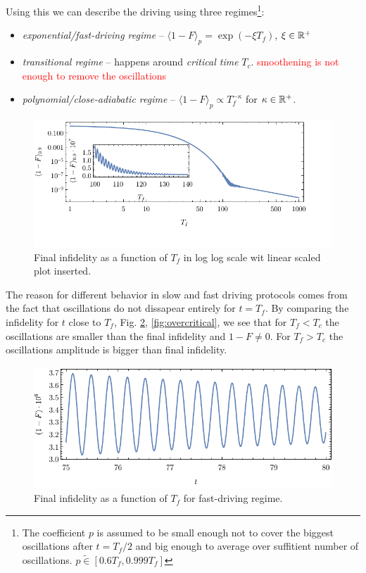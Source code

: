 Using this we can describe the driving using three regimes\footnote{The coefficient $p$ is assumed to be small enough not to cover the biggest oscillations after $t=T_f/2$ and big enough to average over suffitient number of oscillations. $p\tilde\in[0.6T_f,0.999T_f]$}:
\begin{itemize}
    \item \emph{exponential/fast-driving regime} -- $\langle 1-F\rangle_p= \exp(-\xi T_f)$, $\xi\in\mathbb{R}^+$
    \item \emph{transitional regime} -- happens around \emph{critical time} $T_c$. \textcolor{red}{smoothening is not enough to remove the oscillations}
    \item \emph{polynomial/close-adiabatic regime} -- $\langle 1-F\rangle_p\propto T_f^{-\kappa}$ for $\kappa\in \mathbb{R}^+$.
\end{itemize}

\begin{figure}[H]
    \centering
    \includegraphics[scale=1.2]{../img/infidCombined1.pdf}
    \caption{Final infidelity as a function of $T_f$ in log log scale wit linear scaled plot inserted.}
    \label{fig:infidCombined}
\end{figure}


The reason for different behavior in slow and fast driving protocols comes from the fact that oscillations do not dissapear entirely for $t=T_f$. By comparing the infidelity for $t$ close to $T_f$, Fig. \ref{fig:undercritical}, \ref{fig:overcritical}, we see that for $T_f<T_c$ the oscillations are smaller than the final infidelity and $1-F\neq 0$. For $T_f>T_c$ the oscillations amplitude is bigger than final infidelity.

\begin{figure}[H]
    \centering
    \includegraphics[scale=1.2]{../img/undercritical.pdf}
    \caption{Final infidelity as a function of $T_f$ for fast-driving regime.}
    \label{fig:undercritical}
\end{figure}

